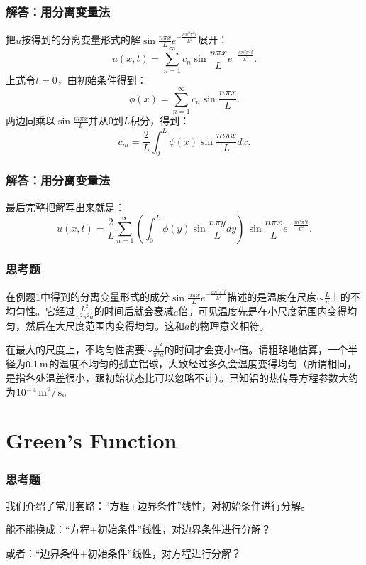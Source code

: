 \documentclass[CJK]{beamer}
\begin{document}
\begin{frame}
  \frametitle{解答：用分离变量法}
  把$u$按得到的分离变量形式的解$\sin\frac{n\pi x}{L}e^{-\frac{an^2\pi^2t}{L^2}}$展开：
  $$ u(x,t) = \sum_{n=1}^\infty c_n  \sin\frac{n\pi x}{L}e^{-\frac{an^2\pi^2t}{L^2}} .$$
  上式令$t=0$，由初始条件得到：
  $$\phi(x) = \sum_{n=1}^\infty c_n \sin\frac{n\pi x}{L}. $$
  两边同乘以$\sin\frac{m\pi x}{L}$并从$0$到$L$积分，得到：
  $$ c_m = \frac{2}{L}\int_0^L \phi(x)\sin\frac{m\pi x}{L} dx . $$
\end{frame}

\begin{frame}
  \frametitle{解答：用分离变量法}
  最后完整把解写出来就是：
  $$ u(x,t) = \frac{2}{L}\sum_{n=1}^\infty \left(\int_0^L \phi(y)\sin\frac{n\pi y}{L} dy \right)\, \sin\frac{n\pi x}{L}e^{-\frac{an^2\pi^2t}{L^2}} .$$

\end{frame}

\begin{frame}
  \frametitle{思考题}
  在例题1中得到的分离变量形式的成分$\sin\frac{n\pi x}{L}e^{-\frac{an^2\pi^2t}{L^2}}$描述的是温度在尺度$\sim \frac{L}{n}$上的不均匀性。它经过$\frac{L^2}{n^2\pi^2a}$的时间后就会衰减$e$倍。可见温度先是在小尺度范围内变得均匀，然后在大尺度范围内变得均匀。这和$a$的物理意义相符。

  \skipline

  在最大的尺度上，不均匀性需要$\sim \frac{L^2}{\pi^2a}$的时间才会变小$e$倍。请粗略地估算，一个半径为$0.1\,\mathrm{m}$的温度不均匀的孤立铝球，大致经过多久会温度变得均匀（所谓相同，是指各处温差很小，跟初始状态比可以忽略不计）。已知铝的热传导方程参数大约为$10^{-4}\,\mathrm{m}^2/\,\mathrm{s}$。
\end{frame}


\section{Green's Function}

\begin{frame}
  \frametitle{思考题}

  我们介绍了常用套路：{\blue “方程+边界条件”线性，对初始条件进行分解。}
  
  能不能换成：{\blue “方程+初始条件”线性，对边界条件进行分解？}

  或者：{\blue “边界条件+初始条件”线性，对方程进行分解？}
  
\end{frame}  
\end{document}
